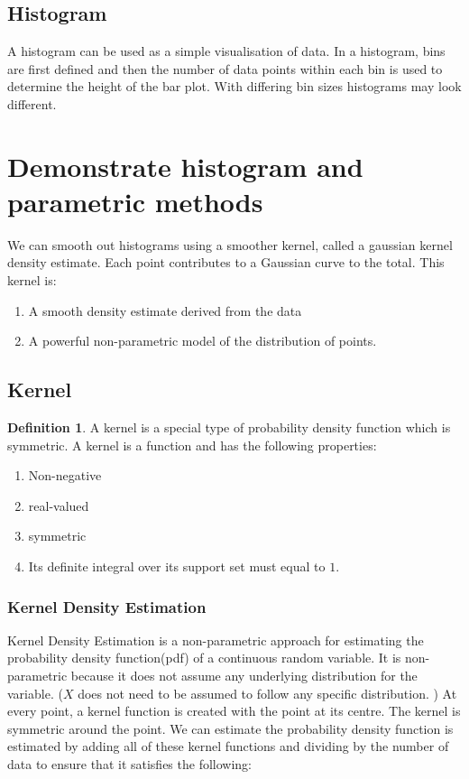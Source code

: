 \documentclass[twoside]{article}
\theoremstyle{definition}
\theoremstyle{definition}
\newtheorem*{proof1}{Definition}
\newenvironment{ddef}{\begin{dBox}\begin{proof1}}{\hfill{\scriptsize}\end{proof1}\end{dBox}}
\begin{document}
\subsection{Histogram}
A histogram can be used as a simple visualisation of data. In a histogram, bins are first defined and then the number of data points within each bin is used to determine the height of the bar plot. With differing bin sizes histograms may look different. 


\section{Demonstrate histogram and parametric methods}

We can smooth out histograms using a smoother kernel, called a gaussian kernel density estimate. Each point contributes to a Gaussian curve to the total. This kernel is:

\begin{enumerate}
  \item A smooth density estimate derived from the data
  \item A powerful non-parametric model of the distribution of points. 
\end{enumerate}

\subsection{Kernel}


\begin{ddef}
  A kernel is a special type of probability density function which is symmetric. A kernel is a function and has the following properties:
  \begin{enumerate}
    \item Non-negative
    \item real-valued
    \item symmetric 
    \item Its definite integral over its support set must equal to $1$.
  \end{enumerate}
\end{ddef}

\subsubsection{Kernel Density Estimation}
Kernel Density Estimation is a non-parametric approach for estimating the probability density function(pdf) of a continuous random variable. It is non-parametric because it does not assume any underlying distribution for the variable. ($X$ does not need to be assumed to follow any specific distribution. ) At every point, a kernel function is created with the point at its centre. The kernel is symmetric around the point. We can estimate the probability density function is estimated by adding all of these kernel functions and dividing by the number of data to ensure that it satisfies the following:
\end{document}
